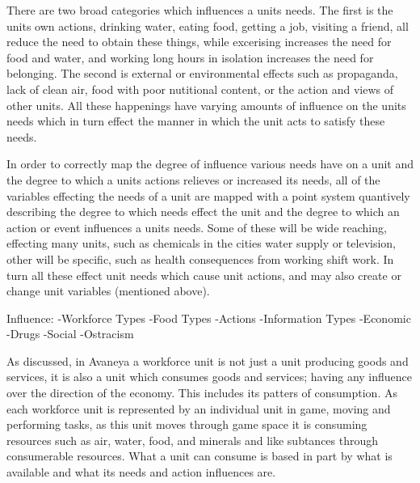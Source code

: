 There are two broad categories which influences a units needs. The first is the units own actions, drinking water, eating food, getting a job, visiting a friend, all reduce the need to obtain these things, while excerising increases the need for food and water, and working long hours in isolation increases the need for belonging. The second is external or environmental effects such as propaganda, lack of clean air, food with poor nutitional content, or the action and views of other units. All these happenings have varying amounts of influence on the units needs which in turn effect the manner in which the unit acts to satisfy these needs.

In order to correctly map the degree of influence various needs have on a unit and the degree to which a units actions relieves or increased its needs, all of the variables effecting the needs of a unit are mapped with a point system quantively describing the degree to which needs effect the unit and the degree to which an action or event influences a units needs. Some of these will be wide reaching, effecting many units, such as chemicals in the cities water supply or television, other will be specific, such as health consequences from working shift work. In turn all these effect unit needs which cause unit actions, and may also create or change unit variables (mentioned above). 



Influence:
-Workforce Types
-Food Types
-Actions
-Information Types
-Economic 
-Drugs
-Social
-Ostracism



%
%
%
%
%
%
%





As discussed, in Avaneya a workforce unit is not just a unit producing goods and services, it is also a unit which consumes goods and services; having any influence over the direction of the economy. This includes its patters of consumption. As each workforce unit is represented by an individual unit in game, moving and performing tasks, as this unit moves through game space it is consuming resources such as air, water, food, and minerals and like subtances through consumerable resources. What a unit can consume is based in part by what is available and what its needs and action influences are.

